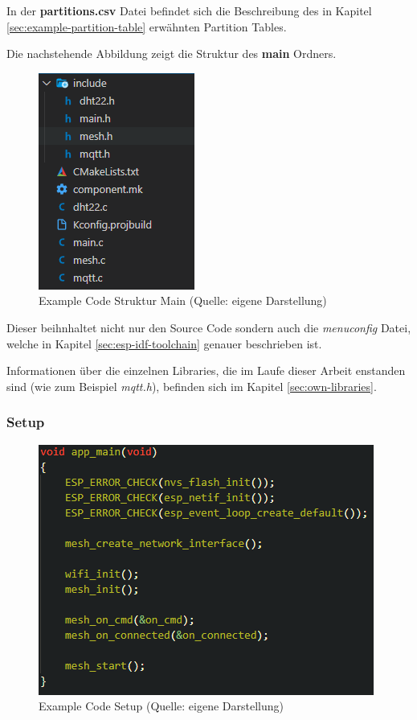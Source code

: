 In der \textbf{partitions.csv} Datei befindet sich die Beschreibung des in Kapitel \ref{sec:example-partition-table} erwähnten Partition Tables.

Die nachstehende Abbildung zeigt die Struktur des \textbf{main} Ordners.

\begin{figure}[H]
    \begin{center}
        \includegraphics[scale=0.8]{images/example_code_structure_main.png}
        \caption{Example Code Struktur Main (Quelle: eigene Darstellung)}
        \label{abb:example_code_structure_main}
    \end{center}
\end{figure}

Dieser beihnhaltet nicht nur den Source Code sondern auch die \textit{menuconfig} Datei, welche in Kapitel \ref{sec:esp-idf-toolchain} genauer beschrieben ist.

Informationen über die einzelnen Libraries, die im Laufe dieser Arbeit enstanden sind (wie zum Beispiel \textit{mqtt.h}), befinden sich im Kapitel \ref{sec:own-libraries}.

\subsubsection{Setup}

\begin{figure}[H]
    \begin{center}
        \includegraphics[scale=0.8]{images/example_code_setup.png}
        \caption{Example Code Setup (Quelle: eigene Darstellung)}
        \label{abb:example_code_setup}
    \end{center}
\end{figure}

